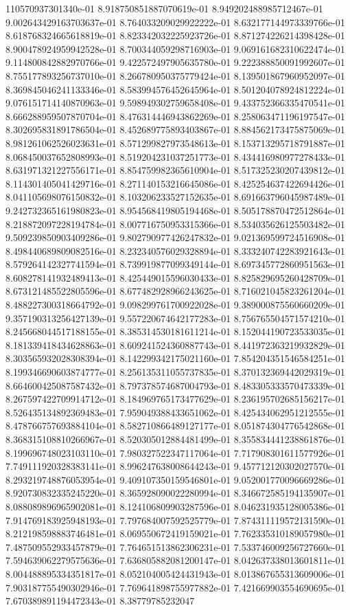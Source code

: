 110570937301340e-01	8.918750851887070619e-01	8.949202488985712467e-01	9.002643429163703637e-01	8.764033209029922222e-01	8.632177144973339766e-01	8.618768324665618819e-01	8.823342032225923726e-01	8.871274226214398428e-01	8.900478924959942528e-01	8.700344059298716903e-01	9.069161682310622474e-01	9.114800842882970766e-01	9.422572497905635780e-01	9.222388850091992607e-01	8.755177893256737010e-01	8.266780950375779424e-01	8.139501867960952097e-01	8.369845046241133346e-01	8.583994576452645964e-01	8.501204078924812224e-01	9.076151714140870963e-01	9.598949302759658408e-01	9.433752366335470541e-01	8.666288959507870704e-01	8.476314446943862269e-01	8.258063471196197547e-01	8.302695831891786504e-01	8.452689775893403867e-01	8.884562173475875069e-01	8.981261062526023631e-01	8.571299827973548613e-01	8.153713295718791887e-01	8.068450037652808993e-01	8.519204231037251773e-01	8.434416980977278433e-01	8.631971321227556171e-01	8.854759982365610904e-01	8.517325230207439812e-01	8.114301405041429716e-01	8.271140153216645086e-01	8.425254637422694426e-01	8.041105698076150832e-01	8.103206233527152635e-01	8.691663796045987489e-01	9.242732365161980823e-01	8.954568419805194468e-01	8.505178870472512864e-01	8.218872097228194784e-01	8.007716750953315366e-01	8.534035626125503482e-01	9.509239850903409286e-01	9.802790977426247832e-01	9.021369599724516908e-01	8.498440689809082516e-01	8.232340576029328894e-01	8.333240742283921643e-01	8.579264142327741594e-01	8.739919877099349144e-01	8.697345772860951563e-01	8.608278141932489413e-01	8.425449015596030433e-01	8.825829695260428709e-01	8.673121485522805596e-01	8.677482928966243625e-01	8.716021045823261204e-01	8.488227300318664792e-01	9.098299761700922028e-01	9.389000875560660209e-01	9.357190313256427139e-01	9.557220674642177283e-01	8.756765504571574210e-01	8.245668044517188155e-01	8.385314530181611214e-01	8.152044190723533035e-01	8.181339418434628863e-01	8.609241524360887743e-01	8.441972363219932829e-01	8.303565932028308394e-01	8.142299342175021160e-01	7.854204351546584251e-01	8.199346690603874777e-01	8.256135311055737835e-01	8.370132369442029319e-01	8.664600425087587432e-01	8.797378574687004793e-01	8.483305333570473339e-01	8.267597422709914712e-01	8.184969765173477629e-01	8.236195702685156217e-01	8.526435134892369483e-01	7.959049388433651062e-01	8.425434062951212555e-01	8.478766757693884104e-01	8.582710866489127177e-01	8.051874304776542868e-01	8.368315108810266967e-01	8.520305012884481499e-01	8.355834441238861876e-01	8.199696748023103110e-01	7.980327522347117064e-01	7.717908301611577926e-01	7.749111920328383141e-01	8.996247638008644243e-01	9.457712120302027570e-01	8.293219748876053954e-01	9.409107350159546801e-01	9.052001770096669286e-01	8.920730832335245220e-01	8.365928090022280994e-01	8.346672585194135907e-01	8.088089896965902081e-01	8.124106809903287596e-01	8.046231935128005386e-01	7.914769183925948193e-01	7.797684007592525779e-01	7.874311119572131590e-01	8.212198598883746481e-01	8.069550672419159021e-01	7.762335310189057980e-01	7.487509552933457879e-01	7.764651513862306231e-01	7.533746009256727660e-01	7.594639062279575636e-01	7.636805882081200147e-01	8.042637338013601811e-01	8.004488895334351817e-01	8.052104005424431943e-01	8.013867655313609006e-01	7.903187755490302946e-01	7.769641898755977882e-01	7.421669903554690695e-01	7.670389891194472343e-01	8.38779785232047